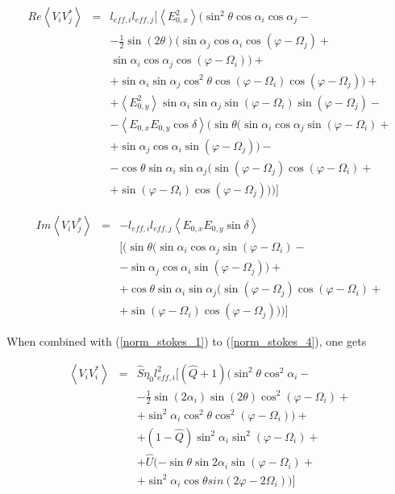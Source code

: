 \documentclass[a4paper,11pt]{report}
\begin{document}
\begin{eqnarray}
Re \left\langle V_i V_j^{*}\right\rangle &=&  l_{eff,i} l_{eff,j}[\left\langle E_{0,x}^2\right\rangle (\sin^2 \theta \cos \alpha_i \cos \alpha_j - \\
& & - \frac{1}{2}  \sin(2\theta) (\sin \alpha_j \cos \alpha_i \cos(\varphi - \Omega_j)+\nonumber \\
& & \sin \alpha_i \cos \alpha_j \cos(\varphi - \Omega_i) ) + \nonumber \\
& & + \sin \alpha_i \sin \alpha_j \cos^2\theta \cos(\varphi - \Omega_i) \cos(\varphi - \Omega_j))+ \nonumber \\
& & + \left\langle E_{0,y}^2 \right\rangle \sin \alpha_i \sin \alpha_j \sin (\varphi - \Omega_i) \sin (\varphi - \Omega_j)-\nonumber \\
& & -\left\langle E_{0,x} E_{0,y} \cos\delta \right\rangle(\sin \theta(\sin \alpha_i \cos \alpha_j \sin (\varphi - \Omega_i) +  \nonumber \\
& & + \sin \alpha_j \cos \alpha_i \sin (\varphi - \Omega_j))-\nonumber \\
& & -\cos \theta \sin \alpha_i \sin \alpha_j(\sin (\varphi - \Omega_j) \cos (\varphi - \Omega_i)+ \nonumber \\
& & + \sin (\varphi - \Omega_i) \cos (\varphi - \Omega_j) ) )]\nonumber
\end{eqnarray}

\begin{eqnarray}
Im \left\langle V_i V_j^{*}\right\rangle &=& - l_{eff,i} l_{eff,j}\left\langle E_{0,x} E_{0,y} \sin \delta \right\rangle \\
& & [ (\sin \theta(\sin \alpha_i \cos \alpha_j \sin (\varphi - \Omega_i) -  \nonumber \\
& & - \sin \alpha_j \cos \alpha_i \sin (\varphi - \Omega_j))+ \nonumber \\
& & + \cos \theta \sin \alpha_i \sin \alpha_j(\sin (\varphi - \Omega_j) \cos (\varphi - \Omega_i)+ \nonumber \\
& & + \sin (\varphi - \Omega_i) \cos (\varphi - \Omega_j) ) )]\nonumber
\end{eqnarray}

When combined with (\ref{norm_stokes_1}) to (\ref{norm_stokes_4}), one gets

\begin{eqnarray}
\left\langle V_i V_i^{*} \right\rangle &=& \hat{S}\eta_0 l_{eff,i}^2[(\hat{Q}+1) (\sin^2 \theta \cos^2 \alpha_i -\\
& & -\frac{1}{2} \sin (2\alpha_i) \sin(2\theta) \cos^2(\varphi - \Omega_i) + \nonumber \\
& & + \sin^2\alpha_i \cos^2\theta \cos^2(\varphi - \Omega_i))+ \nonumber \\
& & + (1-\hat{Q}) \sin^2\alpha_i \sin^2 (\varphi - \Omega_i)+ \nonumber \\
& & +  \hat{U}  (-\sin \theta \sin 2\alpha_i \sin(\varphi - \Omega_i) +\nonumber \\
& & + \sin^2\alpha_i \cos \theta sin(2\varphi - 2\Omega_i)) ]\nonumber
\end{eqnarray}
\end{document}

